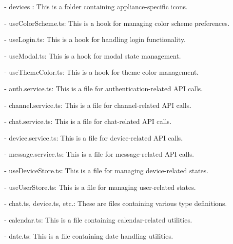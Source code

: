\documentclass[conference]{IEEEtran}
\begin{document}
\begin{enumerate}
\begin{itemize}
\begin{itemize}
\begin{enumerate}
\begin{enumerate}
        \item[-] devices : This is a folder containing appliance-specific icons.\\
        \item[-] useColorScheme.ts: This is a hook for managing color scheme preferences. \\
        \item[-] useLogin.ts: This is a hook for handling login functionality. \\
        \item[-] useModal.ts: This is a hook for modal state management. \\
        \item[-] useThemeColor.ts: This is a hook for theme color management.\\
        \item[-] auth.service.ts: This is a file for authentication-related API calls. \\
        \item[-] channel.service.ts: This is a file for channel-related API calls. \\
        \item[-] chat.service.ts: This is a file for chat-related API calls. \\
        \item[-] device.service.ts: This is a file for device-related API calls. \\
        \item[-] message.service.ts: This is a file for message-related API calls. \\
        \item[-] useDeviceStore.ts: This is a file for managing device-related states. \\
        \item[-] useUserStore.ts: This is a file for managing user-related states. \\
        \item[-] chat.ts, device.ts, etc.: These are files containing various type definitions. \\
        \item[-] calendar.ts: This is a file containing calendar-related utilities. \\
        \item[-] date.ts: This is a file containing date handling utilities.\\
        
\end{enumerate}


\end{enumerate}
\end{itemize}
\end{itemize}
\end{enumerate}
\end{document}
